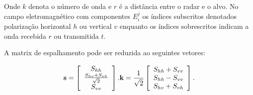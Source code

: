 \documentclass[12pt,a4paper]{article}
\begin{document}
Onde $k$ denota o número de onda e $r$ é a distância entre o radar e o alvo. No campo eletromagnético com componentes $E_{i}^{j}$ os índices subscritos denotados polarização horizontal $h$ ou vertical $v$ enquanto os índices sobrescritos indicam a onda recebida $r$ ou transmitida $t$.    


A matrix de espalhamento pode ser reduzida ao seguintes vetores:

\begin{equation}\label{sec4eqn2}
{\bf s} = \left[
\begin{array}{c}
	S_{hh}      \\
	\frac{S_{hv}+S_{vh}}{\sqrt{2}}     \\
	S_{vv}      \\
\end{array}
\right].
{\bf k} =\frac{1}{\sqrt{2}} \left[
\begin{array}{c}
	S_{hh} + S_{vv}      \\
	S_{hh} - S_{vv}      \\
	S_{hv} + S_{vh}      \\
\end{array}
\right].
\end{equation}



\end{document}
